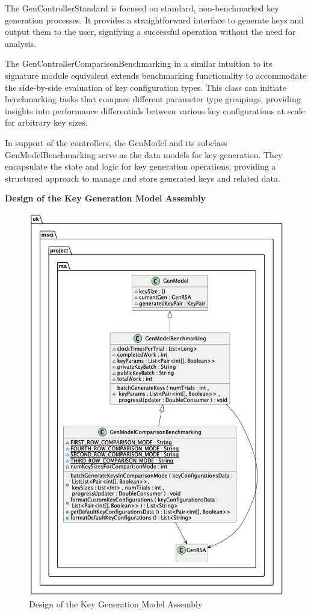 \documentclass[]{final_report}
\theoremstyle{definition}
\begin{document}
The GenControllerStandard is focused on standard, non-benchmarked key generation processes. It provides a straightforward interface to generate keys and output them to the user, signifying a successful operation without the need for analysis.

The GenControllerComparisonBenchmarking in a similar intuition to its signature module equivalent extends benchmarking functionality to accommodate the side-by-side evaluation of key configuration types. This class can initiate benchmarking tasks that compare different parameter type groupings, providing insights into performance differentials between various key configurations at scale for arbitrary key sizes.

In support of the controllers, the GenModel and its subclass GenModelBenchmarking serve as the data models for key generation. They encapsulate the state and logic for key generation operations, providing a structured approach to manage and store generated keys and related data.


\textbf{Design of the Key Generation Model Assembly}


\begin{figure}[H]
    \centering
    \includegraphics[scale=0.39]{main_pictures/genModel.png}
    \caption{Design of the Key Generation Model Assembly}
    \label{fig:KEYMODEDESIGN}
\end{figure}
\end{document}
